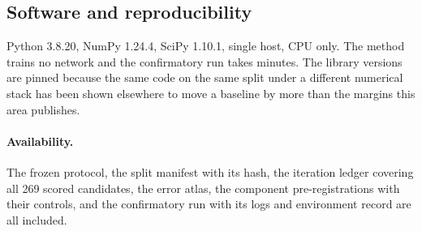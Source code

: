 \subsection*{Software and reproducibility}

Python 3.8.20, NumPy 1.24.4, SciPy 1.10.1, single host, CPU only. The method trains no network and
the confirmatory run takes minutes. The library versions are pinned because the same code on the
same split under a different numerical stack has been shown elsewhere to move a baseline by more
than the margins this area publishes.

\paragraph{Availability.}  The frozen protocol, the split manifest with its hash,
the iteration ledger covering all 269 scored candidates, the error atlas, the component
pre-registrations with their controls, and the confirmatory run with its logs and environment record
are all included.
